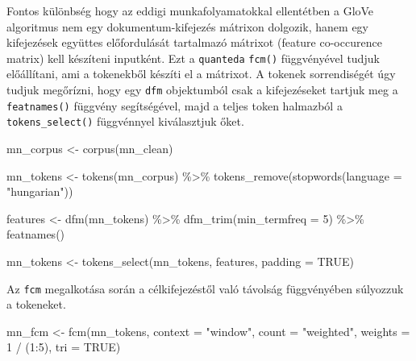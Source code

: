 \documentclass[
]{book}
\newenvironment{Shaded}{\begin{snugshade}}{\end{snugshade}}
\newcommand{\AttributeTok}[1]{\textcolor[rgb]{0.77,0.63,0.00}{#1}}
\newcommand{\ConstantTok}[1]{\textcolor[rgb]{0.00,0.00,0.00}{#1}}
\newcommand{\DecValTok}[1]{\textcolor[rgb]{0.00,0.00,0.81}{#1}}
\newcommand{\FunctionTok}[1]{\textcolor[rgb]{0.00,0.00,0.00}{#1}}
\newcommand{\NormalTok}[1]{#1}
\newcommand{\OtherTok}[1]{\textcolor[rgb]{0.56,0.35,0.01}{#1}}
\newcommand{\SpecialCharTok}[1]{\textcolor[rgb]{0.00,0.00,0.00}{#1}}
\newcommand{\StringTok}[1]{\textcolor[rgb]{0.31,0.60,0.02}{#1}}
\begin{document}
Fontos különbség hogy az eddigi munkafolyamatokkal ellentétben a GloVe
algoritmus nem egy dokumentum-kifejezés mátrixon dolgozik, hanem egy
kifejezések együttes előfordulását tartalmazó mátrixot (feature
co-occurence matrix) kell készíteni inputként. Ezt a \texttt{quanteda}
\texttt{fcm()} függvényével tudjuk előállítani, ami a tokenekből készíti
el a mátrixot. A tokenek sorrendiségét úgy tudjuk megőrízni, hogy egy
\texttt{dfm} objektumból csak a kifejezéseket tartjuk meg a
\texttt{featnames()} függvény segítségével, majd a teljes token
halmazból a \texttt{tokens\_select()} függvénnyel kiválasztjuk őket.

\begin{Shaded}
\begin{Highlighting}[]
\NormalTok{mn\_corpus }\OtherTok{\textless{}{-}} \FunctionTok{corpus}\NormalTok{(mn\_clean)}

\NormalTok{mn\_tokens }\OtherTok{\textless{}{-}} \FunctionTok{tokens}\NormalTok{(mn\_corpus) }\SpecialCharTok{\%\textgreater{}\%}
  \FunctionTok{tokens\_remove}\NormalTok{(}\FunctionTok{stopwords}\NormalTok{(}\AttributeTok{language =} \StringTok{"hungarian"}\NormalTok{))}

\NormalTok{features }\OtherTok{\textless{}{-}} \FunctionTok{dfm}\NormalTok{(mn\_tokens) }\SpecialCharTok{\%\textgreater{}\%}
  \FunctionTok{dfm\_trim}\NormalTok{(}\AttributeTok{min\_termfreq =} \DecValTok{5}\NormalTok{) }\SpecialCharTok{\%\textgreater{}\%}
  \FunctionTok{featnames}\NormalTok{()}

\NormalTok{mn\_tokens }\OtherTok{\textless{}{-}} \FunctionTok{tokens\_select}\NormalTok{(mn\_tokens, features, }\AttributeTok{padding =} \ConstantTok{TRUE}\NormalTok{)}
\end{Highlighting}
\end{Shaded}

Az \texttt{fcm} megalkotása során a célkifejezéstől való távolság
függvényében súlyozzuk a tokeneket.

\begin{Shaded}
\begin{Highlighting}[]
\NormalTok{mn\_fcm }\OtherTok{\textless{}{-}} \FunctionTok{fcm}\NormalTok{(mn\_tokens, }\AttributeTok{context =} \StringTok{"window"}\NormalTok{, }\AttributeTok{count =} \StringTok{"weighted"}\NormalTok{, }\AttributeTok{weights =} \DecValTok{1} \SpecialCharTok{/}\NormalTok{ (}\DecValTok{1}\SpecialCharTok{:}\DecValTok{5}\NormalTok{), }\AttributeTok{tri =} \ConstantTok{TRUE}\NormalTok{)}
\end{Highlighting}
\end{Shaded}
\end{document}
